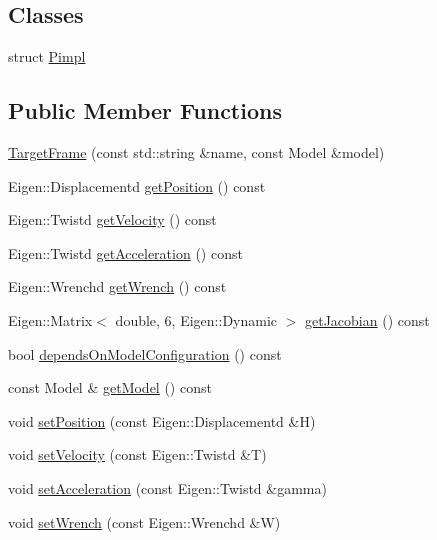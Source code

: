 \subsection*{Classes}
\begin{DoxyCompactItemize}
\item 
struct \hyperlink{structocra_1_1TargetFrame_1_1Pimpl}{Pimpl}
\end{DoxyCompactItemize}
\subsection*{Public Member Functions}
\begin{DoxyCompactItemize}
\item 
\hyperlink{classocra_1_1TargetFrame_ab7cf677c24a55434c4b285127235ae3c}{Target\+Frame} (const std\+::string \&name, const Model \&model)
\item 
Eigen\+::\+Displacementd \hyperlink{classocra_1_1TargetFrame_ab2f3bd3f05be243a5d9e2123b943986d}{get\+Position} () const
\item 
Eigen\+::\+Twistd \hyperlink{classocra_1_1TargetFrame_a5eeda88210d7002c3c73ba949139ed5b}{get\+Velocity} () const
\item 
Eigen\+::\+Twistd \hyperlink{classocra_1_1TargetFrame_ab38d91f0d2f90b102259ec155a8a1245}{get\+Acceleration} () const
\item 
Eigen\+::\+Wrenchd \hyperlink{classocra_1_1TargetFrame_a5e9ccc5e2e5ae8e52a37b5810a76115d}{get\+Wrench} () const
\item 
Eigen\+::\+Matrix$<$ double, 6, Eigen\+::\+Dynamic $>$ \hyperlink{classocra_1_1TargetFrame_a94d2746633b7112afae754370a3a3e1f}{get\+Jacobian} () const
\item 
bool \hyperlink{classocra_1_1TargetFrame_ab4512f64463c359090ffdbead9a9e349}{depends\+On\+Model\+Configuration} () const
\item 
const Model \& \hyperlink{classocra_1_1TargetFrame_acfd238567f0cfb9e6107cd17103ec6ea}{get\+Model} () const
\item 
void \hyperlink{classocra_1_1TargetFrame_a760081f3ae88a43ff91dc6a746083286}{set\+Position} (const Eigen\+::\+Displacementd \&H)
\item 
void \hyperlink{classocra_1_1TargetFrame_aff778ddb4526e90b927ec12bda52e8d6}{set\+Velocity} (const Eigen\+::\+Twistd \&T)
\item 
void \hyperlink{classocra_1_1TargetFrame_a3cbbcab6f3179320bd6c6f8c5aeabc75}{set\+Acceleration} (const Eigen\+::\+Twistd \&gamma)
\item 
void \hyperlink{classocra_1_1TargetFrame_a3d8e094de52e69b626322b6cce57d23e}{set\+Wrench} (const Eigen\+::\+Wrenchd \&W)
\end{DoxyCompactItemize}
